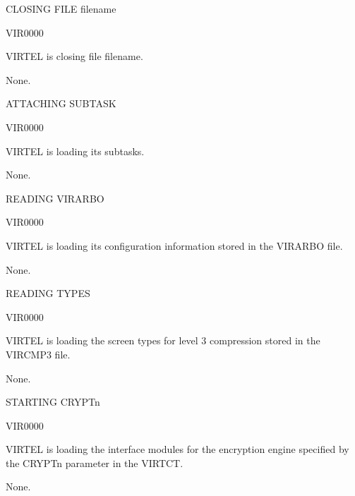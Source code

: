 \documentclass[letterpaper,10pt,english]{sphinxmanual}
\begin{document}
\sphinxAtStartPar
CLOSING FILE filename
\begin{description}
\sphinxAtStartPar
VIR0000

\sphinxAtStartPar
VIRTEL is closing file filename.

\sphinxAtStartPar
None.

\end{description}

\sphinxAtStartPar
ATTACHING SUBTASK
\begin{description}
\sphinxAtStartPar
VIR0000

\sphinxAtStartPar
VIRTEL is loading its subtasks.

\sphinxAtStartPar
None.

\end{description}

\sphinxAtStartPar
READING VIRARBO
\begin{description}
\sphinxAtStartPar
VIR0000

\sphinxAtStartPar
VIRTEL is loading its configuration information stored in the VIRARBO file.

\sphinxAtStartPar
None.

\end{description}

\sphinxAtStartPar
READING TYPES
\begin{description}
\sphinxAtStartPar
VIR0000

\sphinxAtStartPar
VIRTEL is loading the screen types for level 3 compression stored in the VIRCMP3 file.

\sphinxAtStartPar
None.

\end{description}

\sphinxAtStartPar
STARTING CRYPTn
\begin{description}
\sphinxAtStartPar
VIR0000

\sphinxAtStartPar
VIRTEL is loading the interface modules for the encryption engine specified by the CRYPTn parameter in the VIRTCT.

\sphinxAtStartPar
None.

\end{description}
\end{document}
